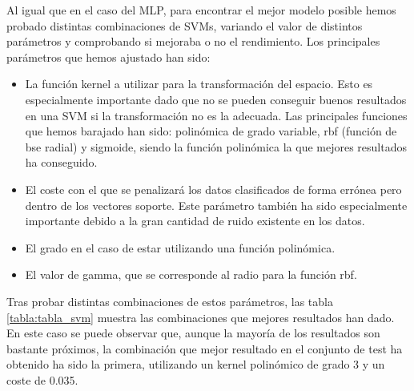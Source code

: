 \documentclass[journal,twoside]{JoPhA}
\begin{document}
	Al igual que en el caso del MLP, para encontrar el mejor modelo posible hemos probado distintas combinaciones de SVMs, variando el valor de distintos parámetros y comprobando si mejoraba o no el rendimiento. Los principales parámetros que hemos ajustado han sido: \\
	
	\begin{itemize} 
		\item La función kernel a utilizar  para la transformación del espacio. Esto es especialmente importante dado que no se pueden conseguir buenos resultados en una SVM si la transformación no es la adecuada. Las principales funciones que hemos barajado han sido: polinómica de grado variable, rbf (función de bse radial) y sigmoide, siendo la función polinómica la que mejores resultados ha conseguido. \\
		\item El coste con el que se penalizará los datos clasificados de forma errónea pero dentro de los vectores soporte. Este parámetro también ha sido especialmente importante debido a la gran cantidad de ruido existente en los datos. \\
		\item  El grado en el caso de estar utilizando una función polinómica. \\
		\item El valor de gamma, que se corresponde al radio para la función rbf. \\
	\end{itemize} 

	Tras probar distintas combinaciones de estos parámetros, las tabla \ref{tabla:tabla_svm} muestra las combinaciones que mejores resultados han dado. En este caso se puede observar que, aunque la mayoría de los resultados son bastante próximos, la combinación que mejor resultado en el conjunto de test ha obtenido ha sido la primera, utilizando un kernel polinómico de grado 3 y un coste de 0.035.
	
\end{document}
